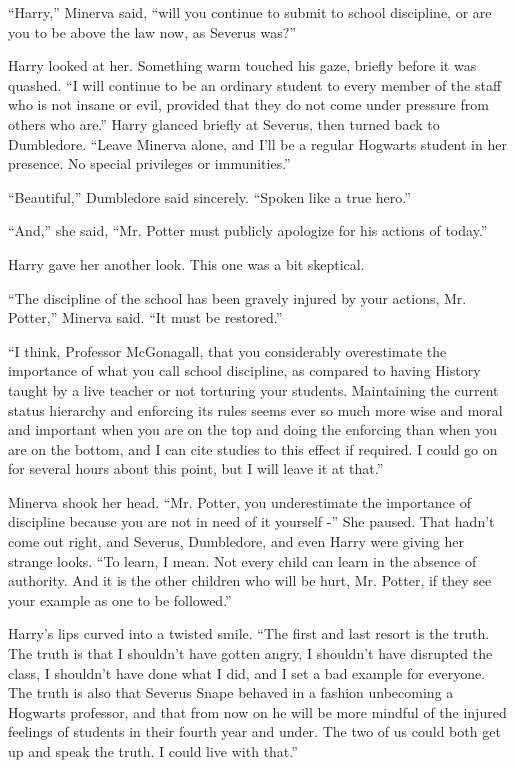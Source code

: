 ``Harry,'' Minerva said, ``will you continue to submit to school
discipline, or are you to be above the law now, as Severus was?''

Harry looked at her. Something warm touched his gaze, briefly before it
was quashed. ``I will continue to be an ordinary student to every member
of the staff who is not insane or evil, provided that they do not come
under pressure from others who are.'' Harry glanced briefly at Severus,
then turned back to Dumbledore. ``Leave Minerva alone, and I'll be a
regular Hogwarts student in her presence. No special privileges or
immunities.''

``Beautiful,'' Dumbledore said sincerely. ``Spoken like a true hero.''

``And,'' she said, ``Mr. Potter must publicly apologize for his actions
of today.''

Harry gave her another look. This one was a bit skeptical.

``The discipline of the school has been gravely injured by your actions,
Mr. Potter,'' Minerva said. ``It must be restored.''

``I think, Professor McGonagall, that you considerably overestimate the
importance of what you call school discipline, as compared to having
History taught by a live teacher or not torturing your students.
Maintaining the current status hierarchy and enforcing its rules seems
ever so much more wise and moral and important when you are on the top
and doing the enforcing than when you are on the bottom, and I can cite
studies to this effect if required. I could go on for several hours
about this point, but I will leave it at that.''

Minerva shook her head. ``Mr. Potter, you underestimate the importance
of discipline because you are not in need of it yourself -'' She paused.
That hadn't come out right, and Severus, Dumbledore, and even Harry were
giving her strange looks. ``To learn, I mean. Not every child can learn
in the absence of authority. And it is the other children who will be
hurt, Mr. Potter, if they see your example as one to be followed.''

Harry's lips curved into a twisted smile. ``The first and last resort is
the truth. The truth is that I shouldn't have gotten angry, I shouldn't
have disrupted the class, I shouldn't have done what I did, and I set a
bad example for everyone. The truth is also that Severus Snape behaved
in a fashion unbecoming a Hogwarts professor, and that from now on he
will be more mindful of the injured feelings of students in their fourth
year and under. The two of us could both get up and speak the truth. I
could live with that.''

